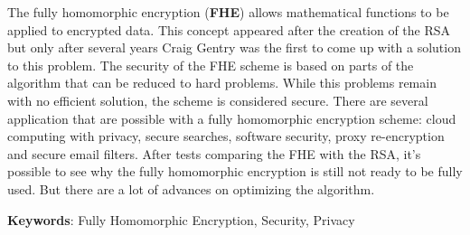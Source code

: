 The fully homomorphic encryption (\textbf{FHE}) allows mathematical functions to be applied to encrypted data. This concept appeared after the creation of the RSA but only after several years Craig Gentry was the first to come up with a solution to this problem.
The security of the FHE scheme is based on parts of the algorithm that can be reduced to hard problems. While this problems remain with no efficient solution, the scheme is considered secure.
There are several application that are possible with a fully homomorphic encryption scheme: cloud computing with privacy, secure searches, software security, proxy re-encryption and secure email filters.
After tests comparing the FHE with the RSA, it's possible to see why the fully homomorphic encryption is still not ready to be fully used. But there are a lot of advances on optimizing the algorithm.

\noindent \textbf{Keywords}: Fully Homomorphic Encryption, Security, Privacy